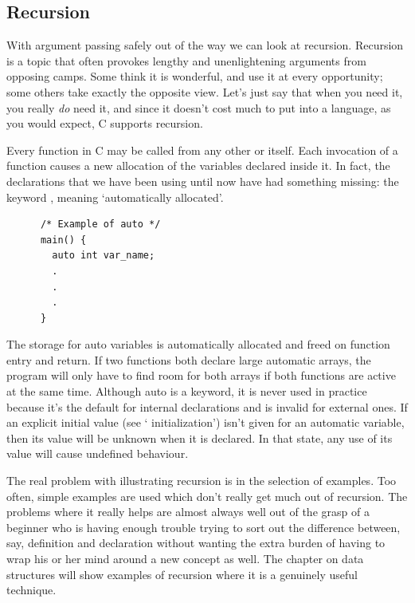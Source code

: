   

  \subsection{Recursion}
   

   With argument passing safely out of the way we can look at recursion.
    Recursion is a topic that often provokes lengthy and unenlightening
    arguments from opposing camps. Some think it is wonderful, and use it at
    every opportunity; some others take exactly the opposite view. Let's
    just say that when you need it, you really \textit{do} need it, and
    since it doesn't cost much to put into a language, as you would expect,
    C supports recursion.


   Every function in C may be called from any other or itself. Each
    invocation of a function causes a new allocation of the variables
    declared inside it. In fact, the declarations that we have been using
    until now have had something missing: the keyword \auto,
    meaning `automatically allocated'.

    \begin{Verbatim}
      /* Example of auto */
      main() {
        auto int var_name;
        .
        .
        .
      }
    \end{Verbatim}

   The storage for auto variables is automatically allocated and freed on
    function entry and return. If two functions both declare large automatic
    arrays, the program will only have to find room for both arrays if both
    functions are active at the same time. Although auto is a keyword, it is
    never used in practice because it's the default for internal
    declarations and is invalid for external ones. If an explicit initial
    value (see ` initialization') isn't given for an automatic
    variable, then its value will be unknown when it is declared. In that
    state, any use of its value will cause undefined behaviour.


   The real problem with illustrating recursion is in the selection of
    examples. Too often, simple examples are used which don't really get
    much out of recursion. The problems where it really helps are almost
    always well out of the grasp of a beginner who is having enough trouble
    trying to sort out the difference between, say, definition and
    declaration without wanting the extra burden of having to wrap his or
    her mind around a new concept as well. The chapter on data structures
    will show examples of recursion where it is a genuinely useful
    technique.



